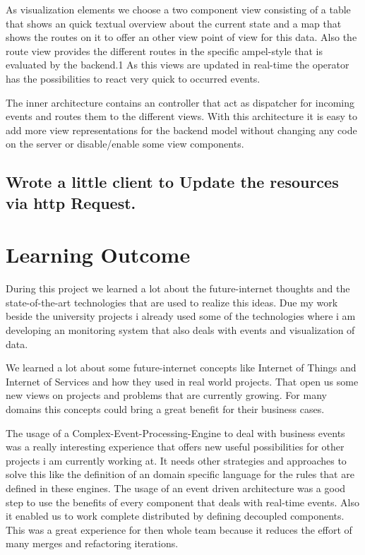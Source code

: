 \documentclass{acm_proc_article-sp}
\begin{document}
As visualization elements we choose a two component view consisting of a table that shows an quick textual overview about the current state and a map that shows the routes on it to offer an other view point of view for this data. Also the route view provides the different routes in the specific ampel-style that is evaluated by the backend.1
As this views are updated in real-time the operator has the possibilities to react very quick to occurred events.

The inner architecture contains an controller that act as dispatcher for incoming events and routes them to the different views. With this architecture it is easy to add more view representations for the backend model without changing any code on the server or disable/enable some view components.
		
\subsection{Wrote a little client to Update the resources via http Request.}

\section{Learning Outcome}
During this project we learned a lot about the future-internet thoughts and the state-of-the-art technologies that are used to realize this ideas.
Due my work beside the university projects i already used some of the technologies where i am developing an monitoring system that also deals with events and visualization of data.

We learned a lot about some future-internet concepts like Internet of Things and Internet of Services and how they used in real world projects. That open us some new views on projects and problems that are currently growing. For many domains this concepts could bring a great benefit for their business cases.

The usage of a Complex-Event-Processing-Engine to deal with business events was a really interesting experience that offers new useful possibilities for other projects i am currently working at. It needs other strategies and approaches to solve this like the definition of an domain specific language for the rules that are defined in these engines.
The usage of an event driven architecture was a good step to use the benefits of every component that deals with real-time events. Also it enabled us to work complete distributed by defining decoupled components. This was a great experience for then whole team because it reduces the effort of many merges and refactoring iterations.
\end{document}
